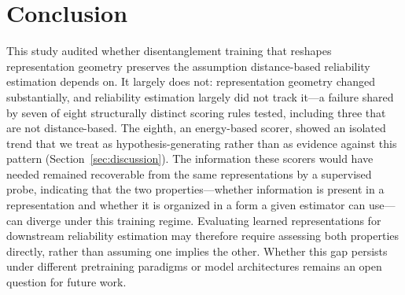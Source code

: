 \section{Conclusion}
\label{sec:conclusion}

This study audited whether disentanglement training that reshapes representation geometry preserves the assumption distance-based reliability estimation depends on. It largely does not: representation geometry changed substantially, and reliability estimation largely did not track it---a failure shared by seven of eight structurally distinct scoring rules tested, including three that are not distance-based. The eighth, an energy-based scorer, showed an isolated trend that we treat as hypothesis-generating rather than as evidence against this pattern (Section~\ref{sec:discussion}). The information these scorers would have needed remained recoverable from the same representations by a supervised probe, indicating that the two properties---whether information is present in a representation and whether it is organized in a form a given estimator can use---can diverge under this training regime. Evaluating learned representations for downstream reliability estimation may therefore require assessing both properties directly, rather than assuming one implies the other. Whether this gap persists under different pretraining paradigms or model architectures remains an open question for future work.
